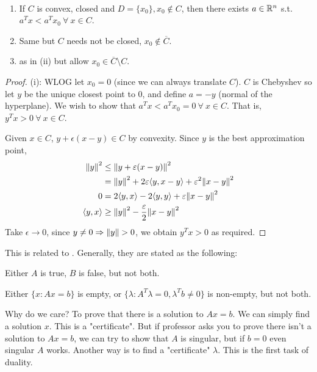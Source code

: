 \documentclass[class=article,crop=false]{standalone}
\begin{document}
\begin{thm}
~\begin{enumerate}[label=(\roman*)]
	\item If $ C$ is convex, closed and  $ D = \{x_0\}, x_0 \not\in C $, then there exists $ a \in \mathbb{R}^{n}$ s.t. $ a^{T}x< a^{T}x_0 \ \forall \ x \in C$.
	\item Same but $ C$ needs not be closed,  $ x_0 \not\in  \overline{C}$.
	\item as in (ii) but allow $ x_0 \in \overline{C}\setminus C$.
\end{enumerate}
\end{thm}
\begin{proof}
	(i): WLOG let $ x_0 = 0$ (since we can always translate $ C$). $ C$ is Chebyshev so let  $ y$ be the unique closest point to  $ 0$, and define  $ a=-y$ (normal of the hyperplane). We wish to show that $ a^{T}x< a^{T} x_0 =0 \ \forall \ x \in C$. That is, $ y^{T} x>0 \ \forall \ x \in C$.

	Given $ x \in C$, $ y + \epsilon (x-y) \in C$ by convexity. Since $ y$ is the best approximation point,
	\begin{align*}
		{\left\lVert{ y}\right\rVert}^2 &\leq {\left\lVert{ y + \varepsilon(x-y)}\right\rVert}^2 \\
		&= {\left\lVert{ y}\right\rVert}^2 + 2 \varepsilon\langle y,x-y \rangle+ \varepsilon^2 {\left\lVert{ x-y}\right\rVert}^2   \\
		0&= 2 \langle y,x \rangle - 2 \langle y,y \rangle + \varepsilon {\left\lVert{ x-y}\right\rVert}^2  \\
		\langle y,x \rangle &\geq {\left\lVert{ y}\right\rVert}^2 -\frac{ \varepsilon}{2} {\left\lVert{ x-y}\right\rVert}^2 
	\end{align*}
	Take $ \epsilon \to 0$, since $ y \neq 0 \Rightarrow {\left\lVert{ y}\right\rVert}>0 $, we obtain $ y^{T}x>0$ as required.
\end{proof}

\begin{remark}
	This is related to . Generally, they are stated as the following:

Either $ A$ is true,  $ B$ is false, but not both.
\end{remark}
\begin{eg}

Either $ \{x: Ax=b\} $ is empty, or $ \{\lambda: A^{T} \lambda =0, \lambda^{T}b \neq 0\} $ is non-empty, but not both.

Why do we care? To prove that there is a solution to $ Ax=b$. We can simply find a solution  $ x$. This is a "certificate". But if professor asks you to prove there isn't a solution to  $ Ax=b$, we can try to show that  $ A$ is singular, but if  $ b=0$ even singular  $ A$ works. Another way is to find a "certificate"  $ \lambda$. This is the first task of duality.
\end{eg}
\end{document}
